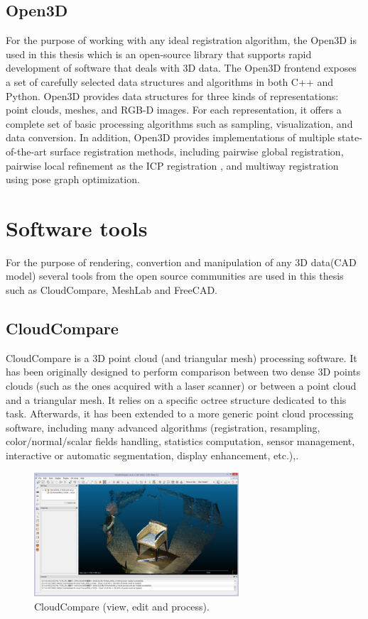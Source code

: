 \subsection{Open3D}

For the purpose of working with any ideal registration algorithm, the Open3D is used in this thesis which is an open-source library that supports rapid development of software that deals with 3D data. The Open3D frontend exposes a set of carefully selected data structures and algorithms in both C++ and Python. Open3D provides data structures for three kinds of representations: point clouds, meshes, and RGB-D images.  For each representation, it offers a complete set of basic processing algorithms such as sampling, visualization, and data conversion. In addition, Open3D  provides  implementations  of  multiple  state-of-the-art surface registration methods, including pairwise global registration, pairwise local refinement as the ICP registration \cite{icp}, and multiway registration  using  pose  graph  optimization. 

\section{Software tools}
For the purpose of rendering, convertion and manipulation of any 3D data(CAD model) several tools from the open source communities are used in this thesis such as CloudCompare, MeshLab and FreeCAD. 

\subsection{CloudCompare}
CloudCompare is a 3D point cloud (and triangular mesh) processing software. It has been originally designed to perform comparison between two dense 3D points clouds (such as the ones acquired with a laser scanner) or between a point cloud and a triangular mesh. It relies on a specific octree structure dedicated to this task.  Afterwards, it has been extended to a more generic point cloud processing software, including many advanced algorithms (registration, resampling, color/normal/scalar fields handling, statistics computation, sensor management, interactive or automatic segmentation, display enhancement, etc.)\cite{cloudcompare},. 

\begin{figure}[!h]
\begin{center}
\includegraphics[width=3in]{figures02/cloudcompare.jpg}
\caption{CloudCompare (view, edit and process).}
\end{center}
\end{figure}


